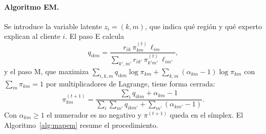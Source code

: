 \documentclass[11pt,a4paper]{article}
\begin{document}
\paragraph{Algoritmo EM.} Se introduce la variable latente $z_i=(k,m)$, que indica qué región y qué experto explican al cliente $i$. El paso E calcula
\begin{equation}
q_{ikm}=\frac{r_{ik}\,\pi^{(t)}_{km}\,\ell_{im}}{\sum_{k',m'} r_{ik'}\,\pi^{(t)}_{k'm'}\,\ell_{im'}},
\label{eq:E}
\end{equation}
y el paso M, que maximiza $\sum_{i,k,m}q_{ikm}\log\pi_{km}+\sum_{k,m}(\alpha_{km}-1)\log\pi_{km}$ con $\sum_m\pi_{km}=1$ por multiplicadores de Lagrange, tiene forma cerrada:
\begin{equation}
\pi^{(t+1)}_{km}=\frac{\sum_i q_{ikm}+\alpha_{km}-1}{\sum_i\sum_{m'}q_{ikm'}+\sum_{m'}(\alpha_{km'}-1)}.
\label{eq:M}
\end{equation}
Con $\alpha_{km}\ge1$ el numerador es no negativo y $\pi^{(t+1)}$ queda en el símplex. El Algoritmo~\ref{alg:mapem} resume el procedimiento.
\end{document}
